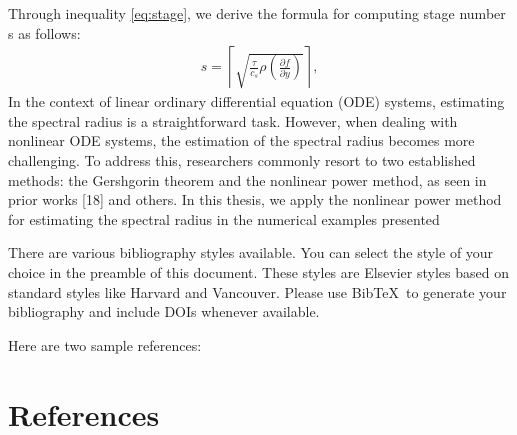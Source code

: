 \documentclass[review,fleqn]{elsarticle}
\begin{document}
Through inequality \eqref{eq:stage}, we derive the formula for computing stage number s as follows:
\begin{align}
    s=\left\lceil\sqrt{\frac{\tau}{c_s}\rho(\frac{\partial f}{\partial y})}\right\rceil ,
\end{align}
In the context of linear ordinary differential equation (ODE) systems,
 estimating the spectral radius is a straightforward task. However, when dealing with nonlinear ODE systems,
  the estimation of the spectral radius becomes more challenging. To address this, researchers commonly resort 
  to two established methods: the Gershgorin theorem and the nonlinear power method, as seen in prior works [18] and others. In this thesis,
   we apply the nonlinear power method for estimating the spectral radius in the numerical examples presented












There are various bibliography styles available. You can select the style of your choice in the preamble of this document. These styles are Elsevier styles based on standard styles like Harvard and Vancouver. Please use Bib\TeX\ to generate your bibliography and include DOIs whenever available.

Here are two sample references: \cite{Feynman1963118,Dirac1953888}

\section*{References}


\end{document}
